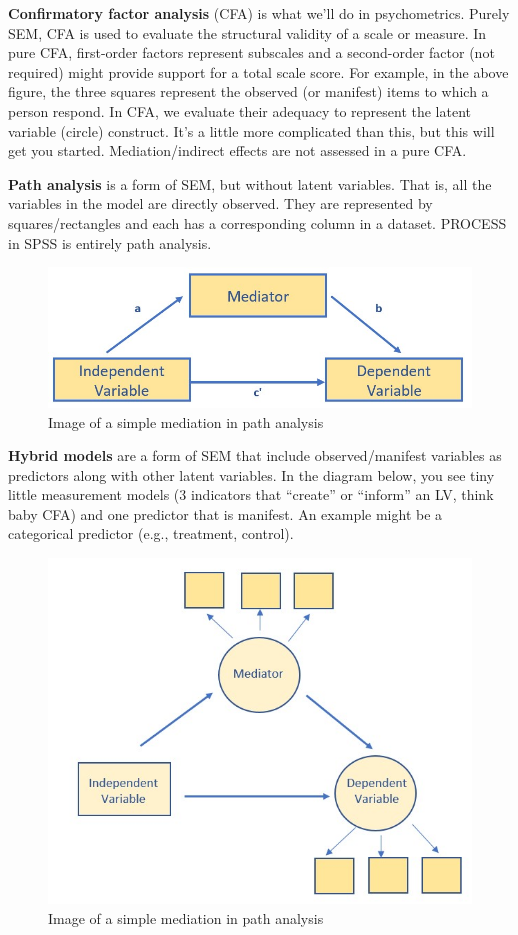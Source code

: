 \documentclass[
]{book}
\begin{document}
\textbf{Confirmatory factor analysis} (CFA) is what we'll do in psychometrics. Purely SEM, CFA is used to evaluate the structural validity of a scale or measure. In pure CFA, first-order factors represent subscales and a second-order factor (not required) might provide support for a total scale score. For example, in the above figure, the three squares represent the observed (or manifest) items to which a person respond. In CFA, we evaluate their adequacy to represent the latent variable (circle) construct. It's a little more complicated than this, but this will get you started. Mediation/indirect effects are not assessed in a pure CFA.

\textbf{Path analysis} is a form of SEM, but without latent variables. That is, all the variables in the model are directly observed. They are represented by squares/rectangles and each has a corresponding column in a dataset. PROCESS in SPSS is entirely path analysis.

\begin{figure}
\centering
\includegraphics{images/SimpleMod/SimpleMed.jpg}
\caption{Image of a simple mediation in path analysis}
\end{figure}

\textbf{Hybrid models} are a form of SEM that include observed/manifest variables as predictors along with other latent variables. In the diagram below, you see tiny little measurement models (3 indicators that ``create'' or ``inform'' an LV, think baby CFA) and one predictor that is manifest. An example might be a categorical predictor (e.g., treatment, control).

\begin{figure}
\centering
\includegraphics{images/SimpleMod/HybridMed.jpg}
\caption{Image of a simple mediation in path analysis}
\end{figure}
\end{document}
